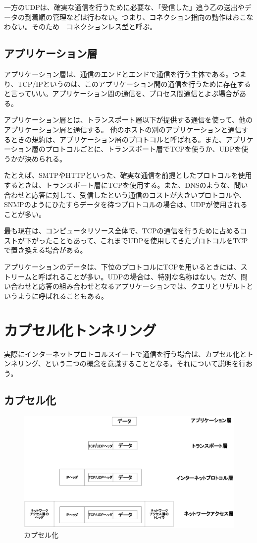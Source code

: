 一方のUDPは、確実な通信を行うために必要な、「受信した」追う乙の送出やデータの到着順の管理などは行わない。つまり、コネクション指向の動作はおこなわない。そのため　コネクションレス型と呼ぶ。


\subsection{アプリケーション層}
アプリケーション層は、通信のエンドとエンドで通信を行う主体である。つまり、TCP/IPというのは、このアプリケーション間の通信を行うために存在すると言っていい。アプリケーション間の通信を、プロセス間通信とよぶ場合がある。

アプリケーション層とは、トランスポート層以下が提供する通信を使って、他のアプリケーション層と通信する。
他のホストの別のアプリケーションと通信するときの規約は、アプリケーション層のプロトコルと呼ばれる。また、アプリケーション層のプロトコルごとに、トランスポート層でTCPを使うか、UDPを使うかが決められる。

たとえば、SMTPやHTTPといった、確実な通信を前提としたプロトコルを使用するときは、トランスポート層にTCPを使用する。また、DNSのような、問い合わせと応答に対して、受信したという通信のコストが大きいプロトコルや、SNMPのようにひたすらデータを待つプロトコルの場合は、UDPが使用されることが多い。

最も現在は、コンピュータリソース全体で、TCPの通信を行うために占めるコストが下がったこともあって、これまでUDPを使用してきたプロトコルをTCPで置き換える場合がある。

アプリケーションのデータは、下位のプロトコルにTCPを用いるときには、ストリームと呼ばれることが多い。UDPの場合は、特別な名称はない。だが、問い合わせと応答の組み合わせとなるアプリケーションでは、クエリとリザルトというように呼ばれることもある。

\section{カプセル化トンネリング}

実際にインターネットプロトコルスイートで通信を行う場合は、カプセル化とトンネリング、という二つの概念を意識することとなる。それについて説明を行おう。

\subsection{カプセル化}

\begin{figure}
	\includegraphics[width=12cm,clip]{draw/encupselation.eps}
	\caption{カプセル化}
	\label{fig:encupselation}
\end{figure}

